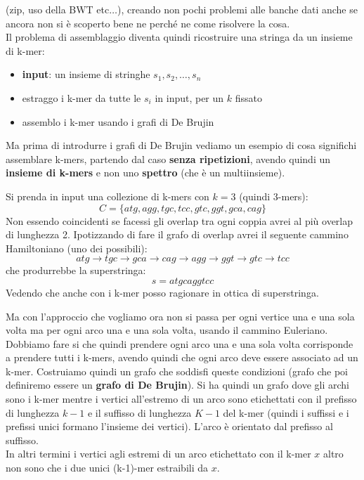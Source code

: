 \documentclass[a4paper,12pt, oneside]{book}
\begin{document}
(zip, uso della BWT etc$\ldots$), creando non pochi problemi alle banche dati
anche se ancora non si è scoperto bene ne perché ne come risolvere la cosa.\\  
Il problema di assemblaggio diventa quindi ricostruire una stringa da un insieme
di k-mer:
\begin{itemize}
  \item \textbf{input}: un insieme di stringhe $s_1,s_2,\ldots,s_n$
  \item estraggo i k-mer da tutte le $s_i$ in input, per un $k$ fissato
  \item assemblo i k-mer usando i grafi di De Brujin
\end{itemize}
Ma prima di introdurre i grafi di De Brujin vediamo un esempio di cosa
significhi assemblare k-mers, partendo dal caso \textbf{senza ripetizioni},
avendo quindi un \textbf{insieme di k-mers} e non uno \textbf{spettro} (che è un
multiinsieme).
\begin{esempio}
  Si prenda in input una collezione di k-mers con $k=3$ (quindi 3-mers):
  \[C=\{atg, agg, tgc,tcc, gtc, ggt, gca, cag\}\]
  Non essendo coincidenti se facessi gli overlap tra ogni coppia avrei al più
  overlap di lunghezza 2. Ipotizzando di fare il grafo di overlap avrei il
  seguente cammino Hamiltoniano (uno dei possibili):
  \[atg\to tgc\to gca\to cag\to agg\to ggt\to gtc\to tcc\]
  che produrrebbe la superstringa:
  \[s=atgcaggtcc\]
  Vedendo che anche con i k-mer posso ragionare in ottica di superstringa.
\end{esempio}
Ma con l'approccio che vogliamo ora non si passa per ogni vertice una e una
sola volta ma per ogni arco una e una sola volta, usando il cammino
Euleriano.\\
Dobbiamo fare si che quindi prendere ogni arco una e una sola volta
corrisponde a prendere tutti i k-mers, avendo quindi che ogni arco deve essere
associato ad un k-mer. Costruiamo quindi un grafo che soddisfi queste
condizioni (grafo che poi definiremo essere un \textbf{grafo di De
  Brujin}). Si ha quindi un grafo dove gli archi sono i k-mer mentre i vertici
all'estremo di un arco sono etichettati con il prefisso di lunghezza $k-1$ e
il suffisso di lunghezza $K-1$ del
k-mer (quindi i suffissi e i prefissi unici formano l'insieme dei
vertici). L'arco è orientato dal prefisso al suffisso. \\
In altri termini i vertici agli estremi di un arco etichettato con il k-mer $x$
altro non sono che i due unici (k-1)-mer estraibili da $x$. 
\end{document}
